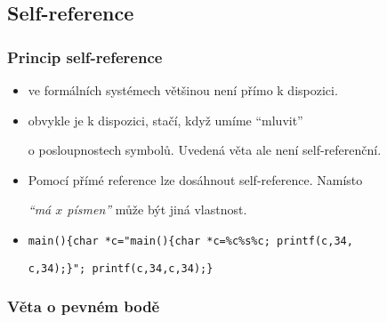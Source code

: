     
    
    \subsection{Self-reference}
    \subsubsection*{Princip self-reference}
    
    \begin{itemize}
    \item {}
    \medskip
    
     ve formálních systémech většinou není přímo k dispozici.
    \medskip
    
    \item {}
    \medskip
    
     obvykle je k dispozici, stačí, když umíme ``mluvit''
    \smallskip
    
    o posloupnostech symbolů. Uvedená věta ale není self-referenční.
    \medskip
    
    \item {}
    \smallskip
    
    \smallskip
    
    \medskip
    
    Pomocí přímé reference lze dosáhnout self-reference. Namísto
    \smallskip
    
    \emph{``má $x$ písmen''} může být jiná vlastnost.
    \medskip
    
    \item \texttt{main()\{char *c="main()\{char *c=\%c\%s\%c; printf(c,34,}
    \smallskip
    
    \texttt{c,34);\}"; printf(c,34,c,34);\}}
    \end{itemize}
    
    
    
    
    \subsubsection*{Věta o pevném bodě}
    
